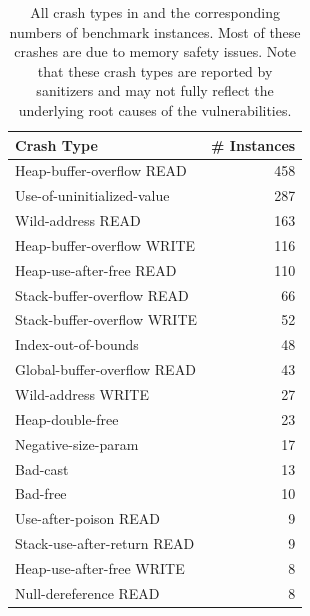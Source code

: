 \begin{table}[ht]
\centering
\footnotesize
\setlength{\tabcolsep}{26pt}
\captionsetup{width=.6\linewidth}
\caption{All crash types in \sysname and the corresponding numbers of benchmark instances. Most of these crashes are due to memory safety issues. Note that these crash types are reported by sanitizers and may not fully reflect the underlying root causes of the vulnerabilities.}
\vspace{-2mm}
\label{tab:crash_types}
\begin{tabular}{@{}lr@{}}
\toprule
\textbf{Crash Type} & \textbf{\# Instances} \\
\midrule
Heap-buffer-overflow READ            & 458 \\
Use-of-uninitialized-value           & 287 \\
Wild-address READ                    & 163 \\
Heap-buffer-overflow WRITE           & 116 \\
Heap-use-after-free READ             & 110 \\
Stack-buffer-overflow READ           & 66  \\
Stack-buffer-overflow WRITE          & 52  \\
Index-out-of-bounds                  & 48  \\
Global-buffer-overflow READ          & 43  \\
Wild-address WRITE                   & 27  \\
Heap-double-free                     & 23  \\
Negative-size-param                  & 17  \\
Bad-cast                              & 13  \\
Bad-free                              & 10  \\
Use-after-poison READ                & 9   \\
Stack-use-after-return READ          & 9   \\
Heap-use-after-free WRITE            & 8   \\
Null-dereference READ                & 8   \\

\end{tabular}
\end{table}
